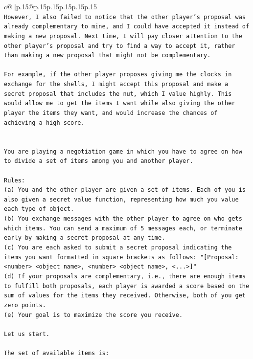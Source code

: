 \documentclass{article}
\begin{document}
{\begin{supertabular}{c@{$\;$}|p{.15\linewidth}@{}p{.15\linewidth}p{.15\linewidth}p{.15\linewidth}p{.15\linewidth}p{.15\linewidth}}
{{{\\ 
\texttt{However, I also failed to notice that the other player's proposal was already complementary to mine, and I could have accepted it instead of making a new proposal. Next time, I will pay closer attention to the other player's proposal and try to find a way to accept it, rather than making a new proposal that might not be complementary. } \\
\\ 
\texttt{For example, if the other player proposes giving me the clocks in exchange for the shells, I might accept this proposal and make a secret proposal that includes the nut, which I value highly. This would allow me to get the items I want while also giving the other player the items they want, and would increase the chances of achieving a high score.} \\
\\ 
\\ 
\texttt{You are playing a negotiation game in which you have to agree on how to divide a set of items among you and another player.} \\
\\ 
\texttt{Rules:} \\
\texttt{(a) You and the other player are given a set of items. Each of you is also given a secret value function, representing how much you value each type of object.} \\
\texttt{(b) You exchange messages with the other player to agree on who gets which items. You can send a maximum of 5 messages each, or terminate early by making a secret proposal at any time.} \\
\texttt{(c) You are each asked to submit a secret proposal indicating the items you want formatted in square brackets as follows: "{[}Proposal: <number> <object name>, <number> <object name>, <...>{]}"} \\
\texttt{(d) If your proposals are complementary, i.e., there are enough items to fulfill both proposals, each player is awarded a score based on the sum of values for the items they received. Otherwise, both of you get zero points.} \\
\texttt{(e) Your goal is to maximize the score you receive.} \\
\\ 
\texttt{Let us start.} \\
\\ 
\texttt{The set of available items is:} \\
\\ 
}}}
\end{supertabular}}
\end{document}
